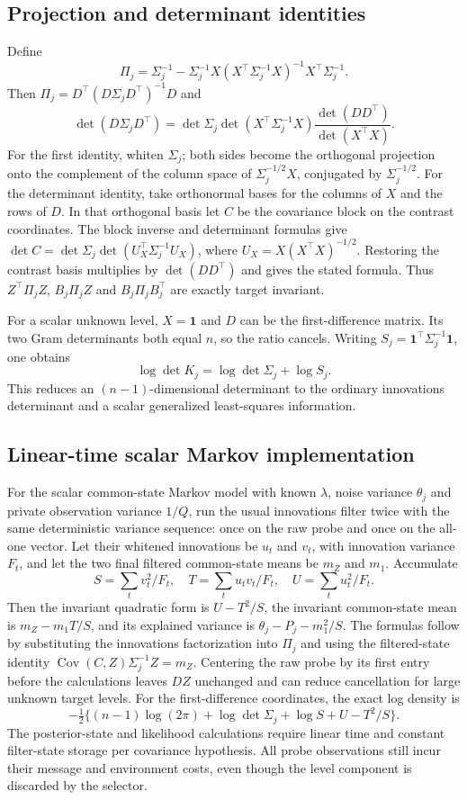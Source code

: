 \subsection{Projection and determinant identities}
Define
\[
\Pi_j=\Sigma_j^{-1}-\Sigma_j^{-1}X
(X^\top\Sigma_j^{-1}X)^{-1}X^\top\Sigma_j^{-1}.
\]
Then $\Pi_j=D^\top(D\Sigma_jD^\top)^{-1}D$ and
\[
\det(D\Sigma_jD^\top)=
\det\Sigma_j\det(X^\top\Sigma_j^{-1}X)
\frac{\det(DD^\top)}{\det(X^\top X)}.
\]
For the first identity, whiten $\Sigma_j$; both sides become the orthogonal projection onto the complement of the column space of $\Sigma_j^{-1/2}X$, conjugated by $\Sigma_j^{-1/2}$.
For the determinant identity, take orthonormal bases for the columns of $X$ and the rows of $D$.
In that orthogonal basis let $C$ be the covariance block on the contrast coordinates.
The block inverse and determinant formulas give $\det C=\det\Sigma_j\det(U_X^\top\Sigma_j^{-1}U_X)$, where $U_X=X(X^\top X)^{-1/2}$.
Restoring the contrast basis multiplies by $\det(DD^\top)$ and gives the stated formula.
Thus $Z^\top\Pi_jZ$, $B_j\Pi_jZ$ and $B_j\Pi_jB_j^\top$ are exactly target invariant.

For a scalar unknown level, $X=\boldsymbol1$ and $D$ can be the first-difference matrix.
Its two Gram determinants both equal $n$, so the ratio cancels.
Writing $S_j=\boldsymbol1^\top\Sigma_j^{-1}\boldsymbol1$, one obtains
\[
\log\det K_j=\log\det\Sigma_j+\log S_j.
\]
This reduces an $(n-1)$-dimensional determinant to the ordinary innovations determinant and a scalar generalized least-squares information.

\subsection{Linear-time scalar Markov implementation}
For the scalar common-state Markov model with known $\lambda$, noise variance $\theta_j$ and private observation variance $1/Q$, run the usual innovations filter twice with the same deterministic variance sequence: once on the raw probe and once on the all-one vector.
Let their whitened innovations be $u_t$ and $v_t$, with innovation variance $F_t$, and let the two final filtered common-state means be $m_Z$ and $m_1$.
Accumulate
\[
S=\sum_tv_t^2/F_t,\quad T=\sum_tu_tv_t/F_t,\quad U=\sum_tu_t^2/F_t.
\]
Then the invariant quadratic form is $U-T^2/S$, the invariant common-state mean is $m_Z-m_1T/S$, and its explained variance is $\theta_j-P_j-m_1^2/S$.
The formulas follow by substituting the innovations factorization into $\Pi_j$ and using the filtered-state identity $\operatorname{Cov}(C,Z)\Sigma_j^{-1}Z=m_Z$.
Centering the raw probe by its first entry before the calculations leaves $DZ$ unchanged and can reduce cancellation for large unknown target levels.
For the first-difference coordinates, the exact log density is
\[
-\tfrac12\{(n-1)\log(2\pi)+\log\det\Sigma_j+\log S+U-T^2/S\}.
\]
The posterior-state and likelihood calculations require linear time and constant filter-state storage per covariance hypothesis.
All probe observations still incur their message and environment costs, even though the level component is discarded by the selector.

